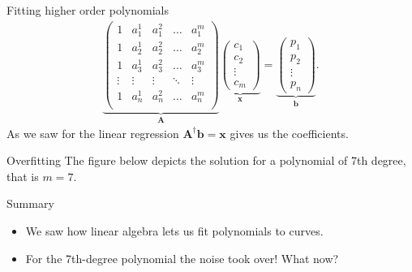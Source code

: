 \documentclass[notes=only]{beamer}
\begin{document}
    \begin{frame}{Fitting higher order polynomials}
      \begin{align}
        \underbrace{
        \begin{pmatrix}
          1       & a_1^1    & a_1^2  & \dots & a_1^m  \\ 
          1       & a_2^1    & a_2^2  & \dots & a_2^m  \\
          1       & a_3^1    & a_3^2  & \dots & a_3^m  \\
          \vdots  & \vdots    & \vdots  & \ddots & \vdots \\ 
          1       & a_n^1    & a_n^2  & \dots & a_n^m  \\
        \end{pmatrix}
        }_{\mathbf{A}}
        \underbrace{
        \begin{pmatrix}
          c_1 \\ c_2 \\ \vdots \\ c_m  
        \end{pmatrix}
        }_{\mathbf{x}}
        =
        \underbrace{
        \begin{pmatrix}
          p_1 \\
          p_2 \\
          \vdots \\ 
          p_n  
        \end{pmatrix}
        }_{\mathbf{b}}
        .
      \end{align}
      As we saw for the linear regression $\mathbf{A}^{\dagger}\mathbf{b} = \mathbf{x}$
      gives us the coefficients.
    \end{frame}

    \begin{frame}{Overfitting}
      The figure below depicts the solution for a polynomial of 7th degree, that is $m=7$.
      \begin{figure}
        \centering
        
      \end{figure}
    \end{frame}

    \begin{frame}{Summary}
      \begin{itemize}
        \item We saw how linear algebra lets us fit polynomials to curves. 
        \item For the 7th-degree polynomial the noise took over! What now?
      \end{itemize}
    \end{frame}
\end{document}
